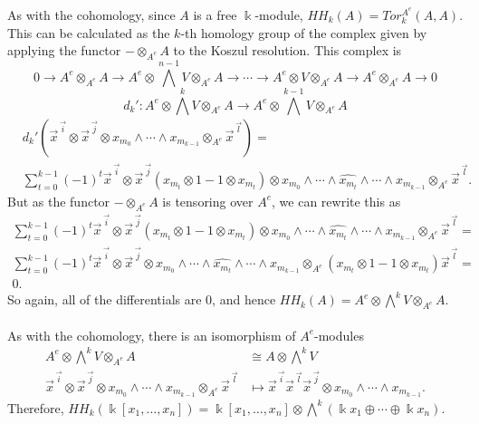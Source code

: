 \documentclass[12pt,a4paper]{article}
\newcommand{\kk}{\Bbbk}
\newcommand\1{_{(1)}}
\newcommand\2{_{(2)}}
\begin{document}
As with the cohomology, since $A$ is a free $\kk$-module, $HH_k(A)=Tor_k^{A^e}(A,A)$.
This can be calculated as the $k$-th homology group of the complex given by applying the functor $-\otimes_{A^e}A$ to the Koszul resolution.
This complex is 
\[
  0\to A^e\otimes_{A^e}A\to A^e\otimes\bigwedge^{n-1}V\otimes_{A^e} A\to\cdots\to A^e\otimes V\otimes_{A^e}A\to A^e\otimes_{A^e}A\to 0
\]
\[
d_k':A^e\otimes\bigwedge^k V\otimes_{A^e}A\to A^e\otimes\bigwedge^{k-1}V\otimes_{A^e}A
\]
\begin{align*}
&d_k'(\vec{x}^{\,\vec{i}}\otimes\vec{x}^{\,\vec{j}}\otimes x_{m_{0}}\wedge\cdots\wedge x_{m_{k-1}}\otimes_{A^e}\vec{x}^{\,\vec{l}})=\\
&\sum_{t=0}^{k-1}(-1)^t\vec{x}^{\,\vec{i}}\otimes\vec{x}^{\,\vec{j}}(x_{m_t}\otimes1-1\otimes x_{m_t})\otimes x_{m_0}\wedge\cdots\wedge\widehat{x_{m_t}}\wedge\cdots\wedge x_{m_{k-1}}\otimes_{A^e}\vec{x}^{\,\vec{l}}.
\end{align*}
But as the functor $-\otimes_{A^e} A$ is tensoring over $A^e$, we can rewrite this as
\begin{align*}
  \sum_{t=0}^{k-1}(-1)^t\vec{x}^{\,\vec{i}}\otimes\vec{x}^{\,\vec{j}}(x_{m_t}\otimes1-1\otimes x_{m_t})\otimes x_{m_0}\wedge\cdots\wedge\widehat{x_{m_t}}\wedge\cdots\wedge x_{m_{k-1}}\otimes_{A^e}\vec{x}^{\,\vec{l}}=\\
  \sum_{t=0}^{k-1}(-1)^t\vec{x}^{\,\vec{i}}\otimes\vec{x}^{\,\vec{j}}\otimes x_{m_0}\wedge\cdots\wedge\widehat{x_{m_t}}\wedge\cdots\wedge x_{m_{k-1}}\otimes_{A^e}(x_{m_t}\otimes1-1\otimes x_{m_t})\vec{x}^{\,\vec{l}}=\\
  0.
\end{align*}
So again, all of the differentials are $0$, and hence $HH_k(A)=A^e\otimes\bigwedge^k V\otimes_{A^e}A$.
\\\\
As with the cohomology, there is an isomorphism of $A^e$-modules
\begin{align*}
  A^e\otimes\bigwedge^k V\otimes_{A^e}A&\cong A\otimes\bigwedge^k V\\
  \vec{x}^{\,\vec{i}}\otimes\vec{x}^{\,\vec{j}}\otimes x_{m_0}\wedge\cdots\wedge x_{m_{k-1}}\otimes_{A^e}\vec{x}^{\,\vec{l}}
  &\mapsto \vec{x}^{\,\vec{i}}\vec{x}^{\,\vec{l}}\vec{x}^{\,\vec{j}}\otimes x_{m_0}\wedge\cdots\wedge x_{m_{k-1}}.
\end{align*}
Therefore, $HH_k(\kk[x_1,\ldots,x_n])=\kk[x_1,\ldots,x_n]\otimes\bigwedge^k \left(\kk x_1\oplus\cdots\oplus\kk x_n\right)$.
\end{document}
